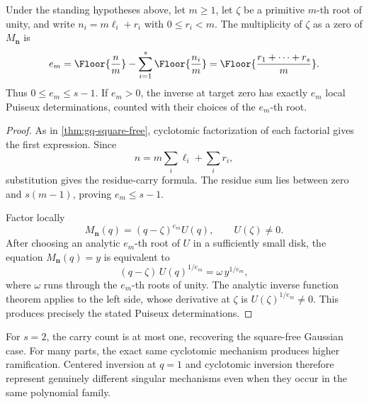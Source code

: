 \begin{theorem}
\label{thm:qm-carry}
Under the standing hypotheses above, let \(m\ge1\), let \(\zeta\) be a
primitive \(m\)-th root of unity, and write
\(n_i=m\ell_i+r_i\) with \(0\le r_i<m\).  The multiplicity of \(\zeta\) as
a zero of \(M_{\bm n}\) is
\[
  e_m
  =\Floor{\frac nm}
   -\sum_{i=1}^{s}\Floor{\frac{n_i}{m}}
  =\Floor{\frac{r_1+\cdots+r_s}{m}}.
\]
Thus \(0\le e_m\le s-1\).  If \(e_m>0\), the inverse at target zero has
exactly \(e_m\) local Puiseux determinations, counted with their choices of
the \(e_m\)-th root.
\end{theorem}

\begin{proof}
As in \cref{thm:gq-square-free}, cyclotomic factorization of each factorial
gives the first expression.  Since
\[
  n=m\sum_i\ell_i+\sum_i r_i,
\]
substitution gives the residue-carry formula.  The residue sum lies between
zero and \(s(m-1)\), proving \(e_m\le s-1\).

Factor locally
\[
  M_{\bm n}(q)=(q-\zeta)^{e_m}U(q),
  \qquad U(\zeta)\ne0.
\]
After choosing an analytic \(e_m\)-th root of \(U\) in a sufficiently small
disk, the equation \(M_{\bm n}(q)=y\) is equivalent to
\[
  (q-\zeta)\,U(q)^{1/e_m}=\omega\,y^{1/e_m},
\]
where \(\omega\) runs through the \(e_m\)-th roots of unity.  The analytic
inverse function theorem applies to the left side, whose derivative at
\(\zeta\) is \(U(\zeta)^{1/e_m}\ne0\).  This produces precisely the stated
Puiseux determinations.
\end{proof}

For \(s=2\), the carry count is at most one, recovering the square-free
Gaussian case.  For many parts, the exact same cyclotomic mechanism produces
higher ramification.  Centered inversion at \(q=1\) and cyclotomic inversion
therefore represent genuinely different singular mechanisms even when they
occur in the same polynomial family.
